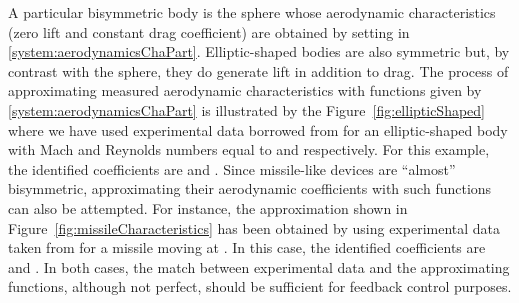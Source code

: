 \documentclass[twocolumn]{autart}
\theoremstyle{definition}
\theoremstyle{definition}
\begin{document}
A particular bisymmetric body is the sphere whose aerodynamic characteristics (zero lift and constant drag coefficient) are obtained by setting  in \eqref{system:aerodynamicsChaPart}.
Elliptic-shaped bodies are also symmetric but, by contrast with the sphere, they do generate lift in addition to drag. The process of approximating measured aerodynamic characteristics with functions given by \eqref{system:aerodynamicsChaPart} is illustrated by the Figure~\ref{fig:ellipticShaped} where we have used experimental data borrowed from \cite[p.19]{1965_WAYNE} for an elliptic-shaped body with Mach and Reynolds numbers equal to  and  respectively. For this example, the identified coefficients are  and . Since missile-like devices are ``almost'' bisymmetric, approximating their aerodynamic coefficients with such functions can also be attempted. For instance, the approximation shown in Figure~\ref{fig:missileCharacteristics} has been obtained by using experimental data taken from \cite[p.54]{1971_SAFFEL} for a missile moving at . In this case, the identified coefficients are  and . In both cases, the match between 
experimental data and the approximating functions, although not perfect, should be sufficient for feedback control purposes.
\end{document}
